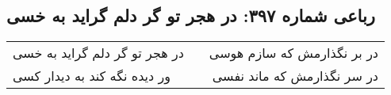 \begin{center}
\section*{رباعی شماره ۳۹۷: در هجر تو گر دلم گراید به خسی}
\label{sec:sh397}
\begin{longtable}{l p{0.5cm} r}
در هجر تو گر دلم گراید به خسی
&&
در بر نگذارمش که سازم هوسی
\\
ور دیده نگه کند به دیدار کسی
&&
در سر نگذارمش که ماند نفسی
\\
\end{longtable}
\end{center}
